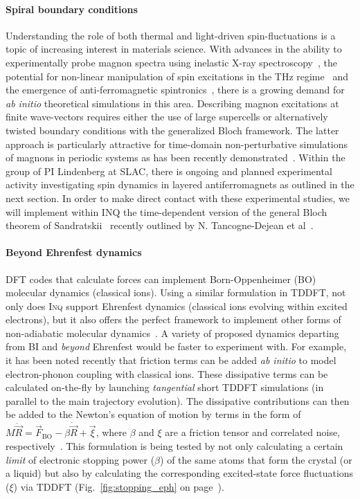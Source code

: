 \paragraph{Spiral boundary conditions}
Understanding the role of both thermal and light-driven spin-fluctuations is a topic of increasing interest in materials science. With advances in the ability to experimentally probe magnon spectra using inelastic X-ray spectroscopy~\cite{Haverkort2010}, the potential for non-linear manipulation of spin excitations in the THz regime~\cite{Kampfrath2011} and the emergence of anti-ferromagnetic spintronics~\cite{Baltz2018}, there is a growing demand for \textit{ab initio} theoretical simulations in this area. Describing magnon excitations at finite wave-vectors requires either the use of large supercells or alternatively twisted boundary conditions with the generalized Bloch framework. The latter approach is particularly attractive for time-domain non-perturbative simulations of magnons in periodic systems as has been recently demonstrated~\cite{Tancogne-Dejean2020}. Within the group of PI Lindenberg at SLAC, there is ongoing and planned experimental activity investigating spin dynamics in layered antiferromagnets as outlined in the next section. In order to make direct contact with these experimental studies, we will implement within \textsc{INQ} the time-dependent version of the general Bloch theorem of Sandratskii~\cite{Sandratskii1986} recently outlined by N. Tancogne-Dejean et al~\cite{Tancogne-Dejean2020}. 

\paragraph{Beyond Ehrenfest dynamics}

DFT codes that calculate forces can implement Born-Oppenheimer (BO) molecular dynamics (classical ions).
Using a similar formulation in TDDFT, not only does \textsc{Inq} support Ehrenfest dynamics (classical ions evolving within excited electrons), but it also offers the perfect framework to implement other forms of non-adiabatic molecular dynamics~\cite{Tapavicza2013,Curchod2018}. 
A variety of proposed dynamics departing from BI and \emph{beyond} Ehrenfest would be faster to experiment with.
For example, it has been noted recently that friction terms can be added \emph{ab initio} to model electron-phonon coupling with classical ions.
These dissipative terms can be calculated on-the-fly by launching \emph{tangential} short TDDFT simulations (in parallel to the main trajectory evolution).
The dissipative contributions can then be added to the Newton's equation of motion by terms in the form of \(M \ddot{\vec{R}} = \vec{F}_\text{BO} - \beta\dot{\vec{R}} + \vec{\xi}\), where \(\beta\) and \(\xi\) are a friction tensor and correlated noise, respectively~\cite{Tamm2018}.
This formulation is being tested by not only calculating a certain \emph{limit} of electronic stopping power (\(\beta\)) of the same atoms that form the crystal (or a liquid) but also by calculating the corresponding excited-state force fluctuations (\(\xi\)) via TDDFT (Fig.~\ref{fig:stopping_eph} on page~\pageref{fig:stopping_eph}).\label{page:stopping_eph}




